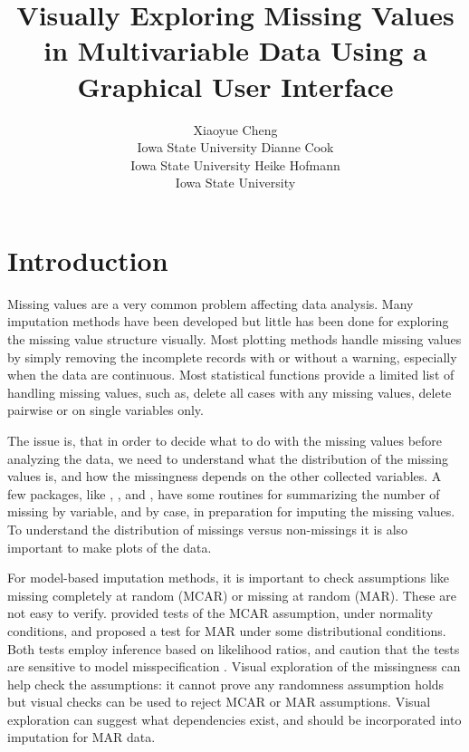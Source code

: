\documentclass[article]{jss}
\author{Xiaoyue Cheng\\Iowa State University \And 
        Dianne Cook\\Iowa State University \And
        Heike Hofmann\\Iowa State University}
\title{Visually Exploring Missing Values in Multivariable Data 
       Using a Graphical User Interface}
\begin{document}
\section{Introduction}\label{introduction}

Missing values are a very common problem affecting data analysis. Many imputation methods have been developed but little has been done for exploring the missing value structure visually.  Most plotting methods handle missing values by simply removing the incomplete records with or without a warning, especially when the data are continuous. Most statistical functions provide a limited list of handling missing values, such as, delete all cases with any missing values, delete pairwise or on single variables only.

The issue is, that in order to decide what to do with the missing values before analyzing the data, we need to understand what the distribution of the missing values is, and how the missingness depends on the other collected variables. A few  packages, like  \citep{hmisc},  \citep{norm}, and  \citep{mice}, have some routines for summarizing the number of missing by variable, and by case, in preparation for imputing the missing values. To understand the distribution of missings versus non-missings it is also important to make plots of the data.

For model-based imputation methods, it is important to check assumptions like missing completely at random (MCAR) or missing at random (MAR). These are not easy to verify. \citet{little1988test} provided tests of the MCAR assumption, under normality conditions, and \citet{jaeger2006testing} proposed a test for MAR under some distributional conditions. Both tests employ inference based on likelihood ratios, and caution that the tests are sensitive to model misspecification \citep{little1988test}.  Visual exploration of the missingness can help check the assumptions: it cannot prove any randomness assumption holds but visual checks can be used to reject MCAR or MAR assumptions. Visual exploration can suggest what dependencies exist, and should be incorporated into imputation for MAR data.
\end{document}
